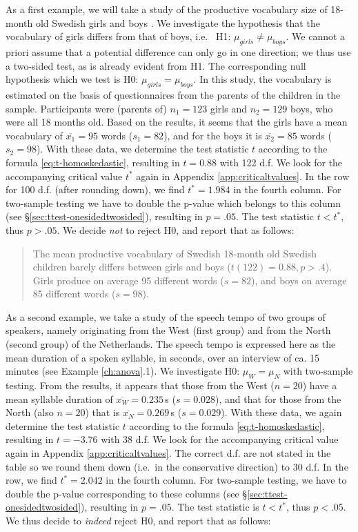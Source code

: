 \documentclass[
]{book}
\begin{document}
As a first example, we will take a study of the productive vocabulary size
of 18-month old Swedish girls and boys \citep{Ande11}. We investigate the hypothesis
that the vocabulary of girls differs from that of boys, i.e.~
H1: \(\mu_{girls} \ne \mu_{boys}\).
We cannot a priori assume that a potential difference can only go in one direction;
we thus use a two-sided test, as is already evident from H1.
The corresponding null hypothesis which we test is H0: \(\mu_{girls} = \mu_{boys}\).
In this study, the vocabulary is estimated on the basis of questionnaires
from the parents of the children in the sample. Participants were
(parents of) \(n_1=123\) girls and \(n_2=129\) boys, who were all 18 months
old. Based on the results, it seems that the girls have a mean vocabulary
of \(\overline{x_1}=95\) words (\(s_1=82\)), and for the boys it is
\(\overline{x_2}=85\) words (\(s_2=98\)). With these data, we determine the
test statistic \(t\) according to the formula
\eqref{eq:t-homoskedastic}, resulting in \(t=0.88\) with 122 d.f. We look for the
accompanying critical value \(t^*\) again in Appendix
\ref{app:criticaltvalues}. In the row for 100 d.f. (after rounding down),
we find \(t^*=1.984\) in the fourth column. For two-sample testing
we have to double the p-value which belongs to this column
(see §\ref{sec:ttest-onesidedtwosided}), resulting in \(p=.05\). The
test statistic \(t < t^*\), thus \(p>.05\). We decide \emph{not} to reject
H0, and report that as follows:

\begin{quote}
The mean productive vocabulary of Swedish 18-month old Swedish children
barely differs between girls and boys
(\(t(122)=0.88, p>.4\)). Girls produce on average 95 different
words (\(s=82\)), and boys on average 85 different words
(\(s=98\)).
\end{quote}

As a second example, we take a study of the speech tempo of two groups
of speakers, namely originating from the West (first group) and
from the North (second group) of the Netherlands. The speech tempo
is expressed here as the mean duration of a spoken syllable, in seconds,
over an interview of ca. 15 minutes (see Example \ref{ch:anova}.1).
We investigate H0: \(\mu_W = \mu_N\) with
two-sample testing. From the results, it appears that those from the West
(\(n=20\)) have a mean syllable duration of
\(\overline{x_W}=0.235\) s (\(s=0.028\)), and that for those from the North (also
\(n=20\)) that is \(\overline{x_N}=0.269\) s (\(s=0.029\)). With these data,
we again determine the test statistic \(t\) according to the formula
\eqref{eq:t-homoskedastic}, resulting in \(t=-3.76\) with 38 d.f. We look for
the accompanying critical value again in Appendix
\ref{app:criticaltvalues}. The correct d.f. are not stated in the table
so we round them down (i.e.~in the conservative direction) to
30 d.f. In the row, we find \(t^*=2.042\) in the fourth column.
For two-sample testing, we have to double the p-value corresponding to
these columns (see
§\ref{sec:ttest-onesidedtwosided}), resulting in \(p=.05\). The
test statistic is \(t < t^*\), thus \(p<.05\). We thus decide
to \emph{indeed} reject H0, and report that as follows:
\end{document}
